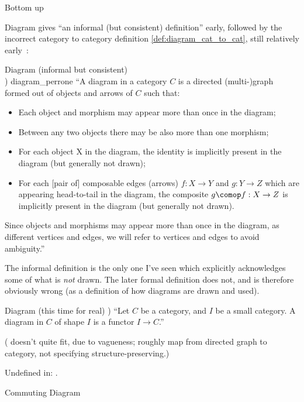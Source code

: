 \begin{plSection}{Bottom up}
\begin{plSection}{Diagram}
gives ``an informal (but consistent) definition'' early,
followed by the incorrect category to
category definition \ref{def:diagram_cat_to_cat}, still relatively 
early~\cite[p$53/181$]{Perrone:2019:CatTheory}:
\begin{plDefinition}{Diagram (informal but consistent)\\
 \textmd{{}})}
{diagram_perrone}
``A diagram in a category $C$ is a directed (multi-)graph formed 
out of objects and arrows of $C$ such that:
\begin{itemize}
\item Each object and morphism 
may appear more than once in the diagram;
\item Between any two objects 
there may be also more than one morphism;
\item For each object X in the diagram, 
the identity is implicitly present in the diagram (but generally
not drawn);
\item For each {[pair of]} composable edges 
(arrows) $f : X \rightarrow Y$ and $g : Y \rightarrow Z$
which are appearing head-to-tail
in the diagram, the composite $g\comop f : X \rightarrow Z$
 is implicitly present in the diagram (but generally
not drawn).
\end{itemize}
Since objects and morphisms may appear 
more than once in the diagram, as different vertices
and edges, we will refer to vertices and edges to avoid ambiguity.''
\end{plDefinition}

The informal definition is the only one I've seen which
explicitly acknowledges some of
what is \emph{not} drawn. 
The later formal definition does not,
and is therefore obviously wrong (as a definition of how diagrams
are drawn and used).

\begin{plDefinition}{Diagram (this time for 
real) \textmd{{}})}
{}
``Let $C$ be a category, and $I$ be a small category. A diagram in
$C$ of shape $I$ is a functor $I \rightarrow C$.''
\end{plDefinition}

( 
doesn't quite fit, due to vagueness; roughly
map from directed graph to category, 
not specifying structure-preserving.)

Undefined in:
.
\end{plSection}
\begin{plSection}{Commuting Diagram}
\label{sec:Commuting_Diagram}


\end{plSection}
\end{plSection}
